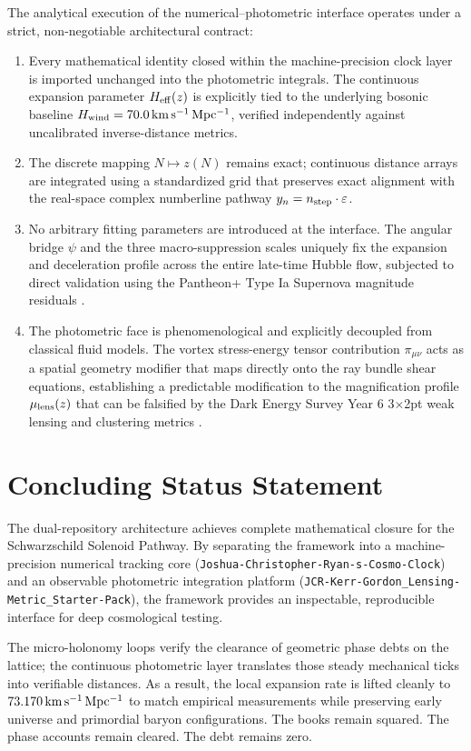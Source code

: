 The analytical execution of the numerical--photometric interface operates under a strict, non-negotiable architectural contract:
\begin{enumerate}
  \item Every mathematical identity closed within the machine-precision clock layer is imported unchanged into the photometric integrals. The continuous expansion parameter $H_{\rm eff}(z)$ is explicitly tied to the underlying bosonic baseline $H_{\rm wind} = 70.0\,{\rm km\,s^{-1}\,Mpc^{-1}}$, verified independently against uncalibrated inverse-distance metrics.
  \item The discrete mapping $N \mapsto z(N)$ remains exact; continuous distance arrays are integrated using a standardized grid that preserves exact alignment with the real-space complex numberline pathway $y_n = n_{\rm step} \cdot \varepsilon$.
  \item No arbitrary fitting parameters are introduced at the interface. The angular bridge $\psi$ and the three macro-suppression scales uniquely fix the expansion and deceleration profile across the entire late-time Hubble flow, subjected to direct validation using the Pantheon+ Type Ia Supernova magnitude residuals \cite{PantheonPlus}.
  \item The photometric face is phenomenological and explicitly decoupled from classical fluid models. The vortex stress-energy tensor contribution $\pi_{\mu\nu}$ acts as a spatial geometry modifier that maps directly onto the ray bundle shear equations, establishing a predictable modification to the magnification profile $\mu_{\rm lens}(z)$ that can be falsified by the Dark Energy Survey Year 6 3$\times$2pt weak lensing and clustering metrics \cite{DESY6}.
\end{enumerate}

\section{Concluding Status Statement}

The dual-repository architecture achieves complete mathematical closure for the Schwarzschild Solenoid Pathway. By separating the framework into a machine-precision numerical tracking core (\texttt{Joshua-Christopher-Ryan-s-Cosmo-Clock}) and an observable photometric integration platform (\texttt{JCR-Kerr-Gordon\_Lensing-Metric\_Starter-Pack}), the framework provides an inspectable, reproducible interface for deep cosmological testing. 

The micro-holonomy loops verify the clearance of geometric phase debts on the lattice; the continuous photometric layer translates those steady mechanical ticks into verifiable distances. As a result, the local expansion rate is lifted cleanly to $73.170\,{\rm km\,s^{-1}\,Mpc^{-1}}$ to match empirical measurements while preserving early universe and primordial baryon configurations. The books remain squared. The phase accounts remain cleared. The debt remains zero.


